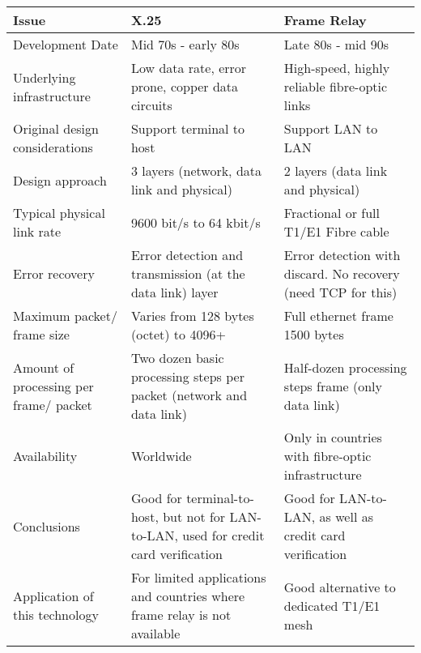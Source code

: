 \begin{table}[H]
    \centering
    \begin{tabularx}{0.9\textwidth}{X|XX}
    \textbf{Issue} & \textbf{X.25} & \textbf{Frame Relay} \\
    \hline
    \hline
    Development Date & Mid 70s - early 80s & Late 80s - mid 90s \\
    Underlying infrastructure & Low data rate, error prone, copper data circuits & High-speed, highly reliable fibre-optic links \\
    Original design considerations & Support terminal to host & Support LAN to LAN \\
    Design approach & 3 layers (network, data link and physical) & 2 layers (data link and physical) \\
    Typical physical link rate & 9600 bit/s to 64 kbit/s & Fractional or full T1/E1 Fibre cable \\
    Error recovery & Error detection and transmission (at the data link) layer & Error detection with discard. No recovery (need TCP for this) \\
    Maximum packet/ frame size & Varies from 128 bytes (octet) to 4096+ & Full ethernet frame 1500 bytes \\
    Amount of processing per frame/ packet & Two dozen basic processing steps per packet (network and data link) & Half-dozen processing steps frame (only data link) \\
    Availability & Worldwide & Only in countries with fibre-optic infrastructure \\
    Conclusions & Good for terminal-to-host, but not for LAN-to-LAN, used for credit card verification & Good for LAN-to-LAN, as well as credit card verification \\
    Application of this technology & For limited applications and countries where frame relay is not available & Good alternative to dedicated T1/E1 mesh
    \end{tabularx}
\end{table}